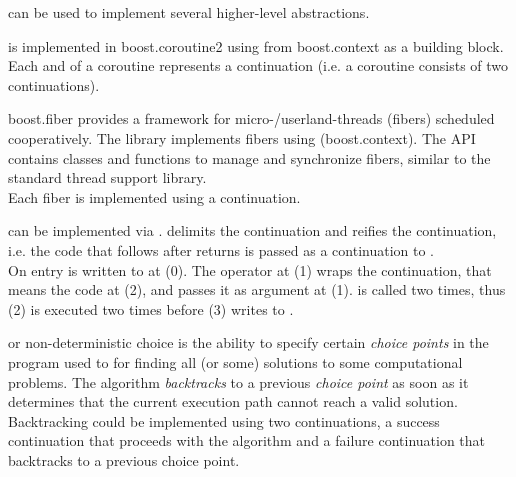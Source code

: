 
\cc can be used to implement several higher-level abstractions.



is implemented in boost.coroutine2\cite{bcoroutine2} using \cc from
boost.context\cite{bcontext} as a building block. Each  and
 of a coroutine represents a continuation (i.e. a coroutine
consists of two continuations).



boost.fiber\cite{bfiber} provides a framework for micro-/userland-threads
(fibers) scheduled cooperatively. The library implements fibers using \cc
(boost.context\cite{bcontext}). The API contains classes and functions to manage
and synchronize fibers, similar to the standard thread support library.\\
Each fiber is implemented using a continuation.


\label{delimited}

can be implemented via \cc.  delimits the continuation and
 reifies the continuation, i.e. the code that follows after
 returns is passed as a continuation to .\\

On entry  is written to  at (0). The  operator
at (1) wraps the continuation, that means the code at (2), and passes it as
argument  at (1).  is called two times, thus (2) is
executed two times before (3) writes  to .



or non-deterministic choice is the ability to specify certain
\emph{choice points} in the program used to for finding all (or some) solutions
to some computational problems. The algorithm \emph{backtracks} to a previous
\emph{choice point} as soon as it determines that the current execution path cannot
reach a valid solution.\\
Backtracking could be implemented using two continuations, a success
continuation that proceeds with the algorithm and a failure continuation that
backtracks to a previous choice point\cite{Ferguson}.
